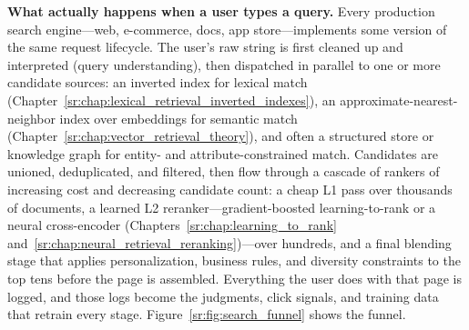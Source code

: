 \textbf{What actually happens when a user types a query.} Every production search engine---web, e-commerce, docs, app store---implements some version of the same request lifecycle. The user's raw string is first cleaned up and interpreted (query understanding), then dispatched in parallel to one or more candidate sources: an inverted index for lexical match (Chapter~\ref{sr:chap:lexical_retrieval_inverted_indexes}), an approximate-nearest-neighbor index over embeddings for semantic match (Chapter~\ref{sr:chap:vector_retrieval_theory}), and often a structured store or knowledge graph for entity- and attribute-constrained match. Candidates are unioned, deduplicated, and filtered, then flow through a cascade of rankers of increasing cost and decreasing candidate count: a cheap L1 pass over thousands of documents, a learned L2 reranker---gradient-boosted learning-to-rank or a neural cross-encoder (Chapters~\ref{sr:chap:learning_to_rank} and~\ref{sr:chap:neural_retrieval_reranking})---over hundreds, and a final blending stage that applies personalization, business rules, and diversity constraints to the top tens before the page is assembled. Everything the user does with that page is logged, and those logs become the judgments, click signals, and training data that retrain every stage. Figure~\ref{sr:fig:search_funnel} shows the funnel.

